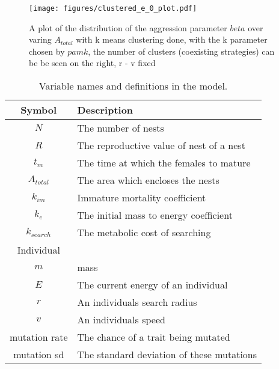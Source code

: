 \documentclass[a4paper,11pt]{article}
\begin{document}
\begin{figure}[h!]
    \centering
    \texttt{[image: figures/clustered\_e\_0\_plot.pdf]}
    \caption{A plot of the distribution of the aggression parameter $beta$ over varing $A_{total}$ with k means clustering done, with the k parameter chosen by $pamk$, the number of clusters (coexisting strategies) can be be seen on the right, r - v fixed}
\end{figure}



\clearpage
\begin{table}[h!]
    \caption{Variable names and definitions in the model.}
    \centering
    \begin{tabular}{c | l }
        \hline
        Symbol & Description\\
        \hline
        \hline
        $N$ &  The number of nests \\
        $R$ &  The reproductive value of nest of a nest\\
        $t_m$  & The time at which the females to mature\\
        $A_{total}$ & The area which encloses the nests\\
        \hline
        $k_{im}$ & Immature mortality coefficient \\
        $k_e$ & The initial mass to energy coefficient \\
        $k_{search}$ & The metabolic cost of searching \\
        \hline
        Individual & \\
        \hline
        $m$ & mass\\
        $E$ & The current energy of an individual\\
        $r$ & An individuals search radius\\
        $v$ & An individuals speed\\ 
        \hline
        mutation rate & The chance of a trait being mutated\\
        mutation sd & The standard deviation of  these mutations\\
        \hline
    \end{tabular}
\end{table}


\end{document}
